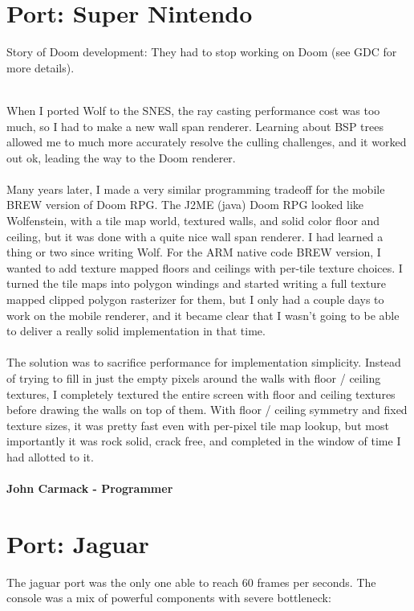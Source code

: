 \documentclass[book.tex]{subfiles}
\begin{document}
\section{Port: Super Nintendo}
Story of Doom development: They had to stop working on Doom (see GDC for more details).\\
\\
 \begin{fancyquotes}
    When I ported Wolf to the SNES, the ray casting performance cost was too much, so I had to make a new wall span renderer.  Learning about BSP trees allowed me  to much more accurately resolve the culling challenges, and it worked out ok, leading the way to the Doom renderer.\\
\\
Many years later, I made a very similar programming tradeoff for the mobile BREW version of Doom RPG.  The J2ME (java) Doom RPG looked like Wolfenstein, with a tile map world, textured walls, and solid color floor and ceiling, but it was done with a quite nice wall span renderer.  I had learned a thing or two since writing Wolf.  For the ARM native code BREW version, I wanted to add texture mapped floors and ceilings with per-tile texture choices.  I turned the tile maps into polygon windings and started writing a full texture mapped clipped polygon rasterizer for them, but I only had a couple days to work on the mobile renderer, and it became clear that I wasn’t going to be able to deliver a really solid implementation in that time.\\
 \\
The solution was to sacrifice performance for implementation simplicity.  Instead of trying to fill in just the empty pixels around the walls with floor / ceiling textures, I completely textured the entire screen with floor and ceiling textures before drawing the walls on top of them.  With floor / ceiling symmetry and fixed texture sizes, it was pretty fast even with per-pixel tile map lookup, but most importantly it was rock solid, crack free, and completed in the window of time I had allotted to it.\\
\\
\textbf{John Carmack - Programmer}
\end{fancyquotes}
\section{Port: Jaguar}
The jaguar port was the only one able to reach 60 frames per seconds. The console was a mix of powerful components with severe bottleneck: 
\end{document}
